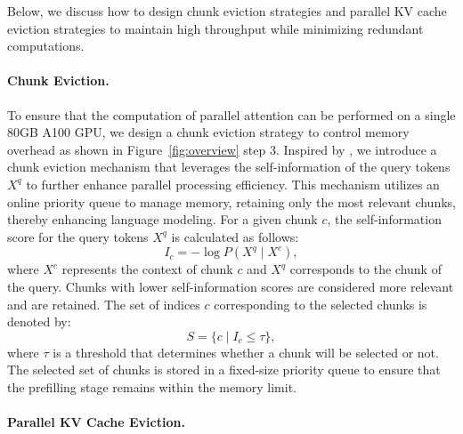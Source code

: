 Below, we discuss how to design chunk eviction strategies and parallel KV cache eviction strategies to maintain high throughput while minimizing redundant computations.

\vspace{-3mm}
\paragraph{Chunk Eviction.}

To ensure that the computation of parallel attention can be performed on a single 80GB A100 GPU, we design a chunk eviction strategy to control memory overhead as shown in Figure~\ref{fig:overview} step 3. Inspired by \citet{ye2023compositional}, we introduce a chunk eviction mechanism that leverages the self-information of the query tokens \( X^q \) to further enhance parallel processing efficiency. This mechanism utilizes an online priority queue to manage memory, retaining only the most relevant chunks, thereby enhancing language modeling. For a given chunk \( c \), the self-information score for the query tokens \( X^q \) is calculated as follows: 
\begin{equation}
I_c = -\log P({X^q} \mid X^c),
\end{equation}
where \( X^c \) represents the context of chunk \( c \) and \( X^q \) corresponds to the chunk of the query. Chunks with lower self-information scores are considered more relevant and are retained. The set of indices \(c\) corresponding to the selected chunks is denoted by: 
\begin{equation}
S = \{ c \mid I_c \leq \tau \},  
\end{equation}  
where \( \tau \) is a threshold that determines whether a chunk will be selected or not. The selected set of chunks is stored in a fixed-size priority queue to ensure that the prefilling stage remains within the memory limit.


\paragraph{Parallel KV Cache Eviction.}




